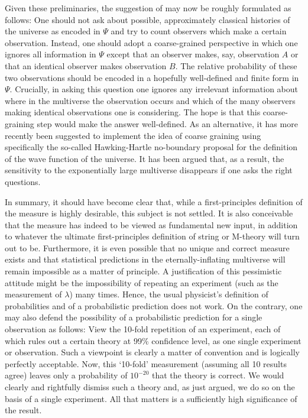 \documentclass[12pt]{article}
\numberwithin{equation}{section}
\begin{document}
Given these preliminaries, the suggestion of \cite{Hartle:2016tpo} may now be roughly formulated as follows: One should not ask about possible, approximately  classical histories of the universe as encoded in $\Psi$ and try to count observers which make a certain observation. Instead, one should adopt a coarse-grained perspective in which one ignores all information in $\Psi$ except that an observer makes, say, observation $A$ or that an identical observer makes observation $B$. The relative probability of these two observations should be encoded in a hopefully well-defined and finite form in $\Psi$. Crucially, in asking this question one ignores any irrelevant information about where in the multiverse the observation occurs and which of the many observers making identical observations one is considering. The hope is that this coarse-graining step would make the answer well-defined. As an alternative, it has more recently been suggested \cite{Halliwell:2018ejl} to implement the idea of coarse graining using specifically the so-called Hawking-Hartle no-boundary proposal \cite{Hartle:1983ai} for the definition of the wave function of the universe. It has been argued that, as a result, the sensitivity to the exponentially large multiverse disappears if one asks the right questions.

In summary, it should have become clear that, while a first-principles definition of the measure is highly desirable, this subject is not settled. It is also conceivable that the measure has indeed to be viewed as fundamental new input, in addition to whatever the ultimate first-principles definition of string or M-theory will turn out to be. Furthermore, it is even possible that no unique and correct measure exists and that statistical predictions in the eternally-inflating  multiverse will remain impossible as a matter of principle. A justification of this pessimistic attitude might be the impossibility of repeating an experiment (such as the measurement of $\lambda$) many times. Hence, the usual physicist's definition of probabilities and of a probabilistic prediction does not work. On the contrary, one may also defend the possibility of a probabilistic prediction for a single observation as follows: View the 10-fold repetition of an experiment, each of which rules out a certain theory at 99\% confidence level, as one single experiment or observation. Such a viewpoint is clearly a matter of convention and is logically perfectly acceptable. Now, this `10-fold' measurement (assuming all 10 results agree) leaves only a probability of $10^{-20}$ that the theory is correct. We would clearly and rightfully dismiss such a theory and, as just argued, we do so on the basis of a single experiment. All that matters is a sufficiently high significance of the result.
\end{document}
